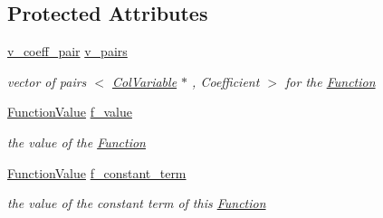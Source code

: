 \subsection*{Protected Attributes}
\begin{DoxyCompactItemize}
\item 
\mbox{\hyperlink{class_s_m_spp__di__unipi__it_1_1_linear_function_aee8988faa66c7c9013613e2c76580ddf}{v\+\_\+coeff\+\_\+pair}} \mbox{\hyperlink{class_s_m_spp__di__unipi__it_1_1_linear_function_a32d816719cd9ec770f15f327e4a2a5dd}{v\+\_\+pairs}}
\begin{DoxyCompactList}\small\item\em vector of pairs $<$ \mbox{\hyperlink{class_s_m_spp__di__unipi__it_1_1_col_variable}{Col\+Variable}} $\ast$ , Coefficient $>$ for the \mbox{\hyperlink{class_s_m_spp__di__unipi__it_1_1_function}{Function}} \end{DoxyCompactList}\item 
\mbox{\label{class_s_m_spp__di__unipi__it_1_1_linear_function_a8f85111f6e8c6c55315450f608ef1659}} 
\mbox{\hyperlink{class_s_m_spp__di__unipi__it_1_1_function_a9ad432406b609e28d340f73e9474bffe}{Function\+Value}} \mbox{\hyperlink{class_s_m_spp__di__unipi__it_1_1_linear_function_a8f85111f6e8c6c55315450f608ef1659}{f\+\_\+value}}
\begin{DoxyCompactList}\small\item\em the value of the \mbox{\hyperlink{class_s_m_spp__di__unipi__it_1_1_function}{Function}} \end{DoxyCompactList}\item 
\mbox{\label{class_s_m_spp__di__unipi__it_1_1_linear_function_a03ccdf227800a3aec2d4a60f8d870fe4}} 
\mbox{\hyperlink{class_s_m_spp__di__unipi__it_1_1_function_a9ad432406b609e28d340f73e9474bffe}{Function\+Value}} \mbox{\hyperlink{class_s_m_spp__di__unipi__it_1_1_linear_function_a03ccdf227800a3aec2d4a60f8d870fe4}{f\+\_\+constant\+\_\+term}}
\begin{DoxyCompactList}\small\item\em the value of the constant term of this \mbox{\hyperlink{class_s_m_spp__di__unipi__it_1_1_function}{Function}} \end{DoxyCompactList}\end{DoxyCompactItemize}

